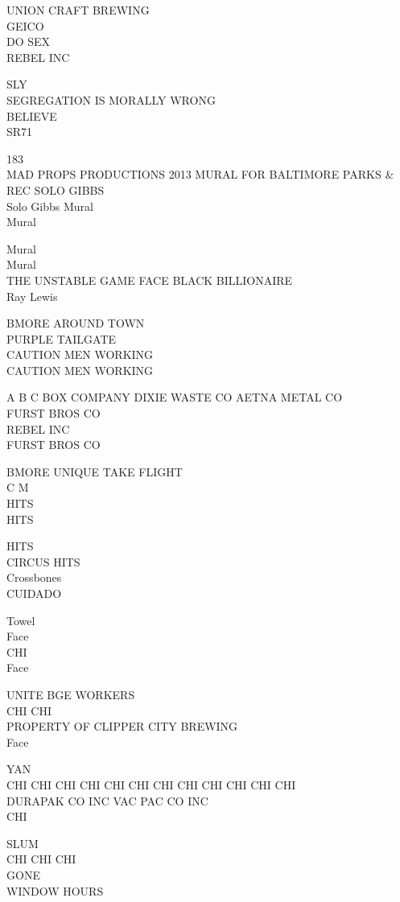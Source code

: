 \documentclass[10pt,letterpaper]{article}
\begin{document}
UNION CRAFT BREWING\\
GEICO\\
DO SEX\\
REBEL INC

SLY\\
SEGREGATION IS MORALLY WRONG\\
BELIEVE\\
SR71

183\\
MAD PROPS PRODUCTIONS 2013 MURAL FOR BALTIMORE PARKS \& REC SOLO GIBBS\\
Solo Gibbs Mural\\
Mural

Mural\\
Mural\\
THE UNSTABLE GAME FACE BLACK BILLIONAIRE\\
Ray Lewis

BMORE AROUND TOWN\\
PURPLE TAILGATE\\
CAUTION MEN WORKING\\
CAUTION MEN WORKING

A B C BOX COMPANY DIXIE WASTE CO AETNA METAL CO\\
FURST BROS CO\\
REBEL INC\\
FURST BROS CO

BMORE UNIQUE TAKE FLIGHT\\
C M\\
HITS\\
HITS

HITS\\
CIRCUS HITS\\
Crossbones\\
CUIDADO

Towel\\
Face\\
CHI\\
Face

UNITE BGE WORKERS\\
CHI CHI\\
PROPERTY OF CLIPPER CITY BREWING\\
Face

YAN\\
CHI CHI CHI CHI CHI CHI CHI CHI CHI CHI CHI CHI\\
DURAPAK CO INC VAC PAC CO INC\\
CHI

SLUM\\
CHI CHI CHI\\
GONE\\
WINDOW HOURS
\end{document}
